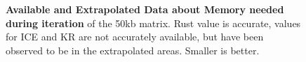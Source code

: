 \begin{figure}[t]
    \begin{centering}
        \caption[Memory needs iterating 50kb]
        {\textbf{Available and Extrapolated Data about Memory needed during
        iteration} of the 50kb matrix. Rust value is accurate, values for ICE
        and KR are not accurately available, but have been observed to be in
        the extrapolated areas. Smaller is better.}
        \label{fig:memiter50}
    \end{centering}
\end{figure}




